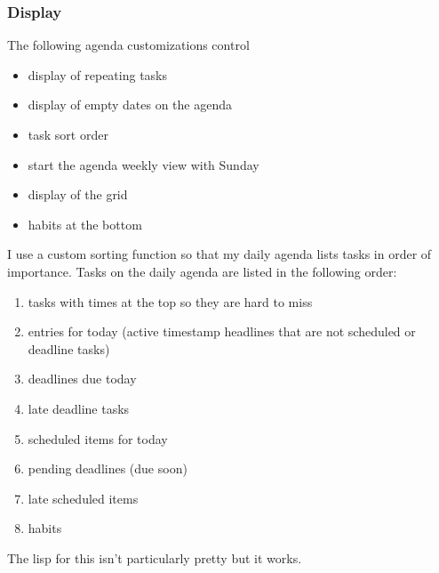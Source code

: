 \documentclass[11pt]{scrartcl}
\begin{document}
\subsubsection{Display}
\label{sec:orgheadline9}

The following agenda customizations control
\begin{itemize}
\item display of repeating tasks
\item display of empty dates on the agenda
\item task sort order
\item start the agenda weekly view with Sunday
\item display of the grid
\item habits at the bottom
\end{itemize}

I use a custom sorting function so that my daily agenda lists tasks in
order of importance.  Tasks on the daily agenda are listed in the
following order:

\begin{enumerate}
\item tasks with times at the top so they are hard to miss
\item entries for today (active timestamp headlines that are not scheduled or deadline tasks)
\item deadlines due today
\item late deadline tasks
\item scheduled items for today
\item pending deadlines (due soon)
\item late scheduled items
\item habits
\end{enumerate}

The lisp for this isn't particularly pretty but it works.
\end{document}
